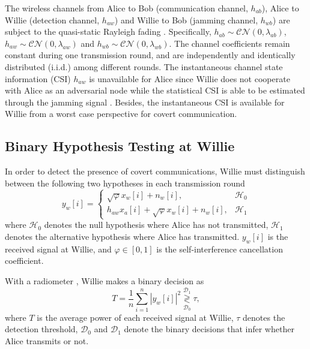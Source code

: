 \documentclass[conference]{IEEEtran}
\begin{document}
The wireless channels from Alice to Bob (communication channel, $h_{ab}$), Alice to Willie (detection channel, $h_{aw}$) and Willie to Bob (jamming channel, $h_{wb}$) are subject to the quasi-static Rayleigh fading \cite{DF}. Specifically, $h_{ab} \sim \mathcal{CN}(0,\lambda_{ab})$, $h_{aw} \sim \mathcal{CN}(0,\lambda_{aw})$ and $h_{wb} \sim \mathcal{CN}(0,\lambda_{wb})$. The channel coefficients remain constant during one transmission round, and are independently and identically distributed (i.i.d.) among different rounds. The instantaneous channel state information (CSI) $h_{aw}$ is unavailable for Alice since Willie does not cooperate with Alice as an adversarial node while the statistical CSI is able to be estimated through the jamming signal \cite{statistical_CSI}. Besides, the instantaneous CSI is available for Willie from a worst case perspective for covert communication.

\subsection{Binary Hypothesis Testing at Willie}
In order to detect the presence of covert communications, Willie must distinguish between the following two hypotheses in each transmission round
\begin{equation}
	y_w[i]= \begin{cases}  \sqrt\varphi  {x_w}[i]+{n_w}[i], & \mathcal{H}_{0} \\{h}_{aw}{x_a}[i] +  \sqrt\varphi  {x_w}[i]+ {n_w}[i], & \mathcal{H}_{1} \end{cases}
\end{equation}
where $\mathcal{H}_{0}$ denotes the null hypothesis where Alice has not
transmitted, $\mathcal{H}_{1}$ denotes the alternative hypothesis
where Alice has transmitted. $y_w[i]$ is the received signal at Willie, and $\varphi \in \left[ {0,1} \right]$ is the self-interference cancellation coefficient\cite{Active2,Active3}.

With a radiometer \cite{Gaussian}, Willie makes a binary decision as
\begin{equation}
	T=\frac{1}{n} \sum_{i=1}^n\left|{y}_w[i]\right|^2 \underset{\mathcal{D}_0}{\stackrel{\mathcal{D}_1}{\gtrless}} \tau,
\end{equation}
where $T$ is the average power of each received signal at Willie, $\tau$ denotes the detection threshold, $\mathcal{D}_0$ and $\mathcal{D}_1$ denote the binary decisions that infer whether Alice transmits or not.
\end{document}
